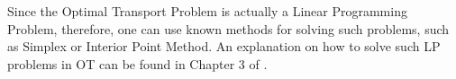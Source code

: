 Since the Optimal Transport Problem is actually a Linear Programming Problem, therefore, one can use known methods for solving such
problems, such as Simplex or Interior Point Method. An explanation on how to solve such LP problems in OT can be found in Chapter
3 of \citet{peyre2019computational}.

